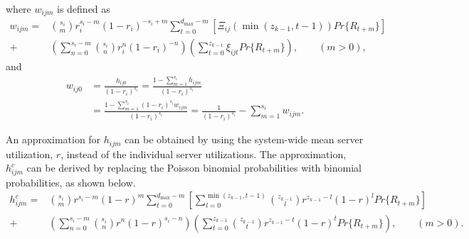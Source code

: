 \documentclass[11pt]{article}\topmargin 0mm
\begin{document}
where $w_{ijm}$ is defined as
\begin{equation}
\label{eq:wijm}
\begin{split}
w_{ijm} = & {s_i \choose m} r_i^{s_i-m}(1-r_i)^{-s_i+m} \sum_{t=0}^{d_{\max}-m} \left[ \Xi_{ij}(\min(z_{k-1},t-1)) Pr\{R_{t+m}\} \right] \\
+ & \left( \sum_{n=0}^{s_i-m} {s_i \choose n} r_i^n (1-r_i)^{-n} \right) \left( \sum_{t=0}^{z_{k-1}} \xi_{ijt} Pr\{R_{t+m}\} \right), \qquad (m>0),
\end{split}
\end{equation}
and
\begin{equation}
\label{eq:wij0}
\begin{split}
w_{ij0} & = \frac{h_{ij0}}{(1-r_i)^{s_i}} = \frac{1-\sum_{m=1}^{s_i} h_{ijm}}{(1-r_i)^{s_i}} \\
& = \frac{1-\sum_{m=1}^{s_i} (1-r_i)^{s_i} w_{ijm}}{(1-r_i)^{s_i}} = \frac{1}{(1-r_i)^{s_i}} - \sum_{m=1}^{s_i} w_{ijm}.
\end{split}
\end{equation}

An approximation for $h_{ijm}$ can be obtained by using the
system-wide mean server utilization, $r$, instead of the
individual server utilizations. The approximation, $h_{ijm}^c$
can be derived by replacing the Poisson binomial probabilities
with binomial probabilities, as shown below.
\begin{equation}
\label{eq:hijm^c}
\begin{split}
h_{ijm}^c = & {s_i \choose m} r^{s_i-m}(1-r)^m \sum_{t=0}^{d_{\max}-m} \left[ \sum_{l=0}^{\min(z_{k-1},t-1)} {z_{k-1} \choose l} r^{z_{k-1}-l} (1-r)^l Pr\{R_{t+m}\} \right] \\
+ & \left( \sum_{n=0}^{s_i-m} {s_i \choose n} r^n (1-r)^{s_i-n} \right) \left( \sum_{t=0}^{z_{k-1}} {z_{k-1} \choose t} r^{z_{k-1}-t} (1-r)^t Pr\{R_{t+m}\} \right), \qquad (m>0). \\
\end{split}
\end{equation}
\end{document}
